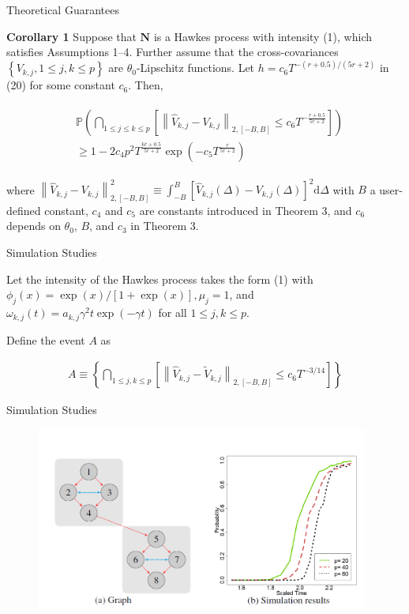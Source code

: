 \documentclass{beamer}		%
\newcommand{\dd}{\mathrm{d}}
\begin{document}
\begin{frame}{Theoretical Guarantees}

\textbf{Corollary 1} Suppose that $\bm{N}$ is a Hawkes process with intensity (1), which satisfies Assumptions 1–4. Further assume that the cross-covariances $\left\{V_{k,j}, 1 \leq j, k \leq p  \right\}$ are $\theta_0$-Lipschitz functions. Let $h = c_6 T^{-(r+0.5)/(5r+2)}$ in (20) for some constant $c_6$. Then,

\begin{align}
\begin{split}
&\mathbb{P} \left(\bigcap_{1 \leq j \leq k \leq p} \left[\left\|\hat{V}_{k,j} - V_{k,j} \right\|_{2, [-B, B]} \leq c_6 T^{-\frac{r+0.5}{5r+2}} \right] \right) \\ &\ge 1 - 2 c_4 p^2 T^{\frac{6r+0.5}{5r+2}} \exp (-c_5 T^{\frac{r}{5r+2}})
\end{split}
\end{align}

where $\left\|\hat{V}_{k,j} - V_{k,j} \right\|_{2,[-B,B]}^2 \equiv \int_{-B}^{B} \left[ \hat{V}_{k,j}(\Delta) - V_{k,j}(\Delta) \right]^2 \dd \Delta$ with $B$ a user-defined constant, $c_4$ and $c_5$ are constants introduced in Theorem 3, and $c_6$ depends on $\theta_0$, $B$, and $c_3$ in Theorem 3.

\end{frame}






\begin{frame}{Simulation Studies}

Let the intensity of the Hawkes process takes the form (1) with $\phi_j(x) =\exp (x) / [1+\exp(x)], \mu_j = 1$, and $\omega_{k,j}(t) = a_{k,j} \gamma^2 t \exp(-\gamma t)$ for all $1 \leq j, k \leq p$.

Define the event $A$ as

\begin{align}
A \equiv \left\{\bigcap_{1\leq j, k\leq p} \left[ \left\| \hat{V}_{k,j} - \tilde{V}_{k,j} \right\|_{2, [-B, B]} \leq c_6 T^{-3/14} \right] \right\}
\end{align}

\end{frame}







\begin{frame}{Simulation Studies}


\begin{figure}
\includegraphics[height=6cm]{figure1.png}
\end{figure}



\end{frame} 
\end{document}
